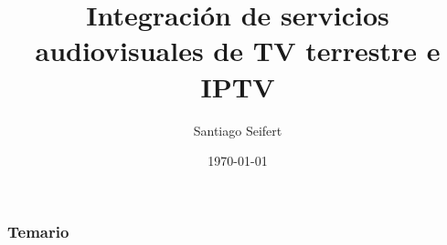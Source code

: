 \documentclass[a4paper,11pt]{beamer}
\title[ISDB-Tb Extendido]{Integración de servicios audiovisuales de TV terrestre e IPTV} %
\author{Santiago Seifert} %
\institute[UNLP] %
{
Universidad Nacional de La Plata \\ %
\medskip
\textit{santiagoseifert@gmail.com} %
}
\date{\today} %
\begin{document}
\begin{frame}
\titlepage %
\end{frame}







\begin{frame}
	\frametitle{Temario}
	\tableofcontents
\end{frame}
\end{document}
